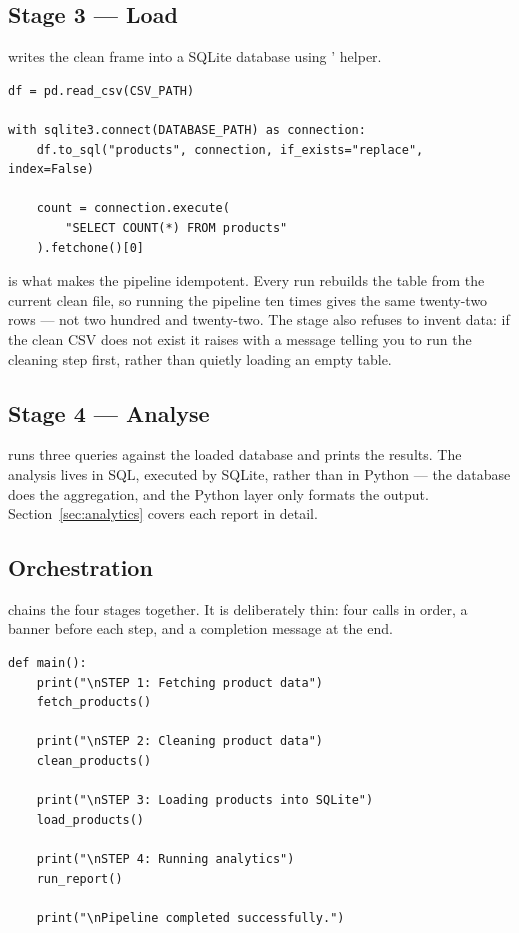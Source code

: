 \subsection{Stage 3 --- Load}

 writes the clean frame into a SQLite
database using '  helper.

\begin{codebox}
\noindent
\begin{lstlisting}[style=py]
df = pd.read_csv(CSV_PATH)

with sqlite3.connect(DATABASE_PATH) as connection:
    df.to_sql("products", connection, if_exists="replace", index=False)

    count = connection.execute(
        "SELECT COUNT(*) FROM products"
    ).fetchone()[0]
\end{lstlisting}
\end{codebox}

 is what makes the pipeline idempotent. Every run
rebuilds the  table from the current clean file, so running
the pipeline ten times gives the same twenty-two rows --- not two hundred and
twenty-two. The stage
also refuses to invent data: if the clean CSV does not exist it raises
 with a message telling you to run the cleaning
step first, rather than quietly loading an empty table.

\subsection{Stage 4 --- Analyse}

 runs three queries against the
loaded database and prints the results. The analysis lives in SQL, executed
by SQLite, rather than in Python --- the database does the aggregation, and
the Python layer only formats the output. Section~\ref{sec:analytics}
covers each report in detail.

\subsection{Orchestration}

 chains the four stages together. It is deliberately
thin: four calls in order, a banner before each step, and a completion
message at the end.

\begin{codebox}
\noindent
\begin{lstlisting}[style=py]
def main():
    print("\nSTEP 1: Fetching product data")
    fetch_products()

    print("\nSTEP 2: Cleaning product data")
    clean_products()

    print("\nSTEP 3: Loading products into SQLite")
    load_products()

    print("\nSTEP 4: Running analytics")
    run_report()

    print("\nPipeline completed successfully.")
\end{lstlisting}
\end{codebox}

